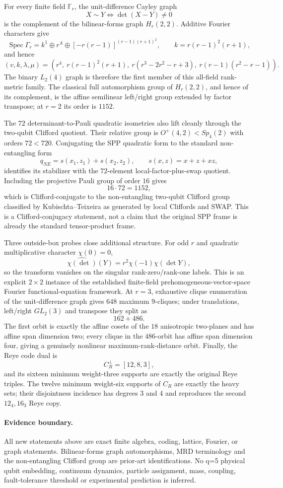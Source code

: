 For every finite field $\mathbb F_r$, the unit-difference Cayley graph
\[
 X\sim Y\iff \det(X-Y)\ne0
\]
is the complement of the bilinear-forms graph $H_r(2,2)$.  Additive Fourier
characters give
\[
 \boxed{\operatorname{Spec}\Gamma_r=
 k^1\oplus r^{\,k}\oplus[-r(r-1)]^{(r-1)(r+1)^2}},
 \qquad k=r(r-1)^2(r+1),
\]
and hence
\[
 \boxed{(v,k,\lambda,\mu)=
 (r^4,\ r(r-1)^2(r+1),\ r(r^3-2r^2-r+3),\ r(r-1)(r^2-r-1))}.
\]
The binary $L_2(4)$ graph is therefore the first member of this all-field
rank-metric family.  The classical full automorphism group of $H_r(2,2)$, and
hence of its complement, is the affine semilinear left/right group extended by
factor transpose; at $r=2$ its order is $1152$.

The $72$ determinant-to-Pauli quadratic isometries also lift cleanly through the
two-qubit Clifford quotient.  Their relative group is $O^+(4,2)<Sp_4(2)$ with
orders $72<720$.  Conjugating the SPP quadratic form to the standard
non-entangling form
\[
 q_{NE}=s(x_1,z_1)+s(x_2,z_2),\qquad s(x,z)=x+z+xz,
\]
identifies its stabilizer with the $72$-element local-factor-plus-swap quotient.
Including the projective Pauli group of order $16$ gives
\[
 \boxed{16\cdot72=1152},
\]
which is Clifford-conjugate to the non-entangling two-qubit Clifford group
classified by Kubischta--Teixeira as generated by local Cliffords and SWAP.
This is a Clifford-conjugacy statement, not a claim that the original SPP frame
is already the standard tensor-product frame.

Three outside-box probes close additional structure.  For odd $r$ and quadratic
multiplicative character $\chi(0)=0$,
\[
 \boxed{\widehat{\chi(\det)}(Y)=r^2\chi(-1)\chi(\det Y)},
\]
so the transform vanishes on the singular rank-zero/rank-one labels.  This is an
explicit $2\times2$ instance of the established finite-field prehomogeneous-vector-space
Fourier functional-equation framework.  At $r=3$, exhaustive clique enumeration
of the unit-difference graph gives $648$ maximum $9$-cliques; under translations,
left/right $GL_2(3)$ and transpose they split as
\[
 \boxed{162+486}.
\]
The first orbit is exactly the affine cosets of the $18$ anisotropic two-planes
and has affine span dimension two; every clique in the $486$-orbit has affine
span dimension four, giving a genuinely nonlinear maximum-rank-distance orbit.
Finally, the Reye code dual is
\[
 C_R^\perp=[12,8,3],
\]
and its sixteen minimum weight-three supports are exactly the original Reye
triples.  The twelve minimum weight-six supports of $C_R$ are exactly the heavy
sets; their disjointness incidence has degrees $3$ and $4$ and reproduces the
second $12_4,16_3$ Reye copy.

\paragraph{Evidence boundary.}
All new statements above are exact finite algebra, coding, lattice, Fourier, or
graph statements.  Bilinear-forms graph automorphisms, MRD terminology and the
non-entangling Clifford group are prior-art identifications.  No q=5 physical
qubit embedding, continuum dynamics, particle assignment, mass, coupling,
fault-tolerance threshold or experimental prediction is inferred.
